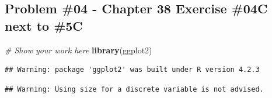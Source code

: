 \documentclass[
]{article}
\newenvironment{Shaded}{\begin{snugshade}}{\end{snugshade}}
\newcommand{\AttributeTok}[1]{\textcolor[rgb]{0.13,0.29,0.53}{#1}}
\newcommand{\CommentTok}[1]{\textcolor[rgb]{0.56,0.35,0.01}{\textit{#1}}}
\newcommand{\DecValTok}[1]{\textcolor[rgb]{0.00,0.00,0.81}{#1}}
\newcommand{\FunctionTok}[1]{\textcolor[rgb]{0.13,0.29,0.53}{\textbf{#1}}}
\newcommand{\NormalTok}[1]{#1}
\newcommand{\OtherTok}[1]{\textcolor[rgb]{0.56,0.35,0.01}{#1}}
\newcommand{\SpecialCharTok}[1]{\textcolor[rgb]{0.81,0.36,0.00}{\textbf{#1}}}
\newcommand{\StringTok}[1]{\textcolor[rgb]{0.31,0.60,0.02}{#1}}
\begin{document}
\newpage

\hypertarget{problem-04---chapter-38-exercise-04c-next-to-5c}{%
\subsection{Problem \#04 - Chapter 38 Exercise \#04C next to
\#5C}\label{problem-04---chapter-38-exercise-04c-next-to-5c}}

\begin{Shaded}
\begin{Highlighting}[]
\CommentTok{\# Show your work here}
\FunctionTok{library}\NormalTok{(ggplot2)}
\end{Highlighting}
\end{Shaded}

\begin{verbatim}
## Warning: package 'ggplot2' was built under R version 4.2.3
\end{verbatim}

\begin{Shaded}
\end{Shaded}

\begin{verbatim}
## Warning: Using size for a discrete variable is not advised.
\end{verbatim}
\end{document}
